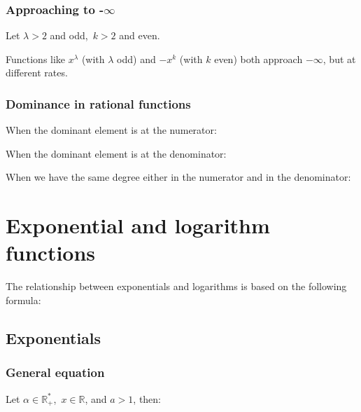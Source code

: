 \documentclass{article}
\begin{document}
\subsubsection{Approaching to -$\infty$}
Let $\lambda > 2$ and odd,\ $k > 2$ and even.


Functions like $x^\lambda$ (with $\lambda$ odd) and $-x^k$ (with $k$ even)
both approach $-\infty$, but at different rates.

\subsubsection{Dominance in rational functions}
When the dominant element is at the numerator:

When the dominant element is at the denominator:

When we have the same degree either in the numerator and in the denominator:


\newpage
\section{Exponential and logarithm functions}
The relationship between exponentials and logarithms is based on the following formula:

\subsection{Exponentials}
\subsubsection{General equation}
Let $\alpha \in \mathbb{R}^*_+$,\ $x \in \mathbb{R}$, and $a>1$, then:

\end{document}
